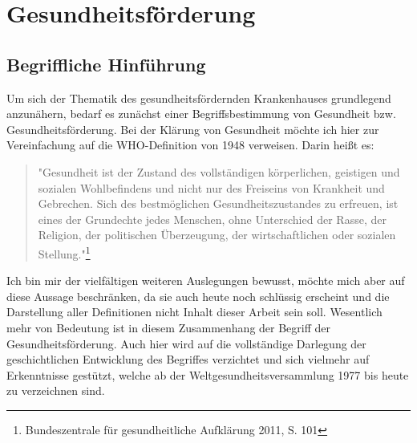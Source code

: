 \section{Gesundheitsförderung}
\label{sec:Gesundheitsförderung}

\subsection{Begriffliche Hinführung}
\label{sec:BegrifflicheHinführung}

Um sich der Thematik des gesundheitsfördernden Krankenhauses grundlegend anzunähern, bedarf es zunächst einer Begriffsbestimmung von Gesundheit bzw. Gesundheitsförderung. Bei der Klärung von Gesundheit möchte ich hier zur Vereinfachung auf die WHO-Definition von 1948 verweisen. Darin heißt es: 

\begin{quotation}
\begin{center}
"Gesundheit ist der Zustand des vollständigen körperlichen, geistigen und sozialen Wohlbefindens und nicht nur des Freiseins von Krankheit und Gebrechen. Sich des bestmöglichen Gesundheitszustandes zu erfreuen, ist eines der Grundechte jedes Menschen, ohne Unterschied der  Rasse, der Religion, der politischen Überzeugung, der wirtschaftlichen oder sozialen Stellung."\footnote{Bundeszentrale für gesundheitliche Aufklärung 2011, S. 101}
\end{center}
\end{quotation}

Ich bin mir der vielfältigen weiteren Auslegungen bewusst, möchte mich aber auf diese Aussage beschränken, da sie auch heute noch schlüssig erscheint und die Darstellung aller Definitionen nicht Inhalt dieser Arbeit sein soll. Wesentlich mehr von Bedeutung ist in diesem Zusammenhang der Begriff der Gesundheitsförderung. Auch hier wird auf die vollständige Darlegung der geschichtlichen Entwicklung des Begriffes verzichtet und sich vielmehr auf Erkenntnisse gestützt, welche ab der Weltgesundheitsversammlung 1977 bis heute zu verzeichnen sind.

